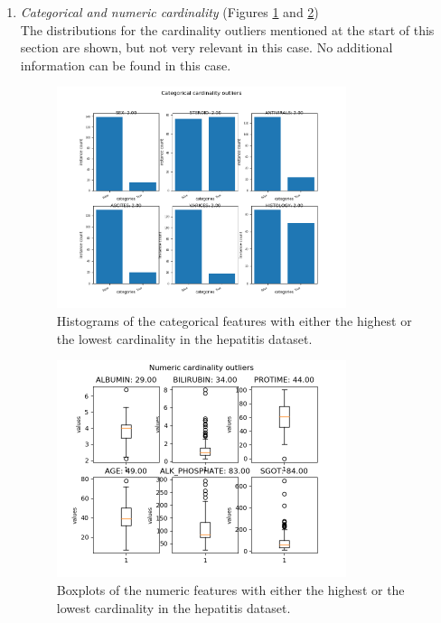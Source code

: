 \documentclass[10pt,a4paper]{report}
\begin{document}
\begin{itemize}
\begin{enumerate}
			\item \textit{Categorical and numeric cardinality} (Figures \ref{fig:HepCardCat} and \ref{fig:HepCardNum}) \\
			The distributions for the cardinality outliers mentioned at the start of this section are shown, but not very relevant in this case. No additional information can be found in this case.
			
			\begin{figure}[H]
				\centering
				\includegraphics[width=0.8\textwidth]{Hep_Card_Cat.png}
				\caption{Histograms of the categorical features with either the highest or the lowest cardinality in the hepatitis dataset.}
				\label{fig:HepCardCat}
			\end{figure}
			
			\begin{figure}[H]
				\centering
				\includegraphics[width=0.8\textwidth]{Hep_Card_Num.png}
				\caption{Boxplots of the numeric features with either the highest or the lowest cardinality in the hepatitis dataset.}
				\label{fig:HepCardNum}
			\end{figure}
			

\end{enumerate}
\end{itemize}
\end{document}
